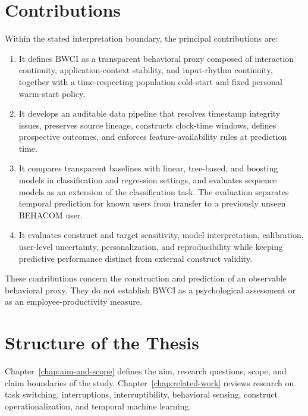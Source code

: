 \section{Contributions}

Within the stated interpretation boundary, the principal contributions are:

\begin{enumerate}
    \item It defines BWCI as a transparent behavioral proxy composed of interaction continuity, application-context stability, and input-rhythm continuity, together with a time-respecting population cold-start and fixed personal warm-start policy.
    
    \item It develops an auditable data pipeline that resolves timestamp integrity issues, preserves source lineage, constructs clock-time windows, defines prospective outcomes, and enforces feature-availability rules at prediction time.

    \item It compares transparent baselines with linear, tree-based, and boosting models in classification and regression settings, and evaluates sequence models as an extension of the classification task. The evaluation separates temporal prediction for known users from transfer to a previously unseen BEHACOM user.

    \item It evaluates construct and target sensitivity, model interpretation, calibration, user-level uncertainty, personalization, and reproducibility while keeping predictive performance distinct from external construct validity.
\end{enumerate}

These contributions concern the construction and prediction of an observable behavioral proxy. They do not establish BWCI as a psychological assessment or as an employee-productivity measure.

\section{Structure of the Thesis}


Chapter~\ref{chap:aim-and-scope} defines the aim, research questions, scope,
and claim boundaries of the study. Chapter~\ref{chap:related-work} reviews
research on task switching, interruptions, interruptibility, behavioral
sensing, construct operationalization, and temporal machine learning.

